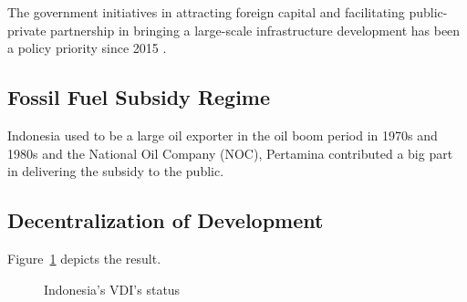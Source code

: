 \documentclass[letterpaper,12pt,leqno]{article}
\begin{document}
The government initiatives in attracting foreign capital and facilitating public-private partnership in bringing a large-scale infrastructure development has been a policy priority since 2015 \citep{pwc_2016}.

\subsection{Fossil Fuel Subsidy Regime}

Indonesia used to be a large oil exporter in the oil boom period in 1970s and 1980s and the National Oil Company (NOC), Pertamina contributed a big part in delivering the subsidy to the public. 

\subsection{Decentralization of Development}

Figure~\ref{f:graph1} depicts the result.


\begin{figure}[t]
\hfill
{}
\caption{Indonesia's VDI's status}
\label{f:graph1}\end{figure}
\end{document}
